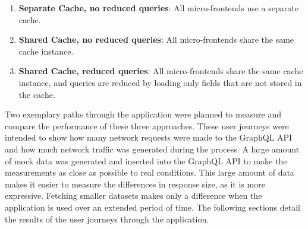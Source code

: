 \begin{enumerate}
  \item \textbf{Separate Cache, no reduced queries}: All micro-frontends use a separate cache.
  \item \textbf{Shared Cache, no reduced queries}: All micro-frontends share the same cache instance.
  \item \textbf{Shared Cache, reduced queries}: All micro-frontends share the same cache instance, and queries are reduced by loading only fields that are not stored in the cache.
\end{enumerate}

\noindent Two exemplary paths through the application were planned to measure and compare the performance of these three approaches. These user journeys were intended to show how many network requests were made to the GraphQL \ac{API} and how much network traffic was generated during the process. A large amount of mock data was generated and inserted into the GraphQL \ac{API} to make the measurements as close as possible to real conditions. This large amount of data makes it easier to measure the differences in response size, as it is more expressive. Fetching smaller datasets makes only a difference when the application is used over an extended period of time. The following sections detail the results of the user journeys through the application.






